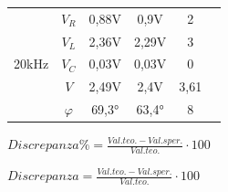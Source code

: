 \documentclass[12pt]{article}
\begin{document}
\begin{center}
\begin{table}[!h]
\begin{tabular}{|c|c|c|c|c|c|}
   
                            \multirow{5}{*}{20kHz} & \cellcolor{ngreen}$V_R$ &\cellcolor{ngreen} 0,88V&\cellcolor{ngreen} 0,9V&\cellcolor{ngreen}2 \\\cline{2-5}
      
                            & \cellcolor{ngreen}$V_L$ &\cellcolor{ngreen} 2,36V&\cellcolor{ngreen} 2,29V &\cellcolor{ngreen} 3\\\cline{2-5}
    
                            &\cellcolor{ngreen} $V_C$ &\cellcolor{ngreen}0,03V&\cellcolor{ngreen} 0,03V&\cellcolor{ngreen}0\\\cline{2-5}
    
                            &\cellcolor{ngreen} $V$   &\cellcolor{ngreen} 2,49V& \cellcolor{ngreen}2,4V&\cellcolor{ngreen} 3,61\\\cline{2-5}
    
                            & \cellcolor{ngreen}$\varphi$ &\cellcolor{ngreen}69,3° &\cellcolor{ngreen} 63,4°& \cellcolor{ngreen}8 \\\hline
                           

    \end{tabular}
\end{table}
$Discrepanza \%=\frac{Val. teo.-Val. sper.}{Val. teo.}\cdot 100$
\end{center}
\FloatBarrier 
$Discrepanza=\frac{Val. teo.-Val. sper.}{Val. teo.}\cdot 100$
\vspace{2mm}
\end{document}
